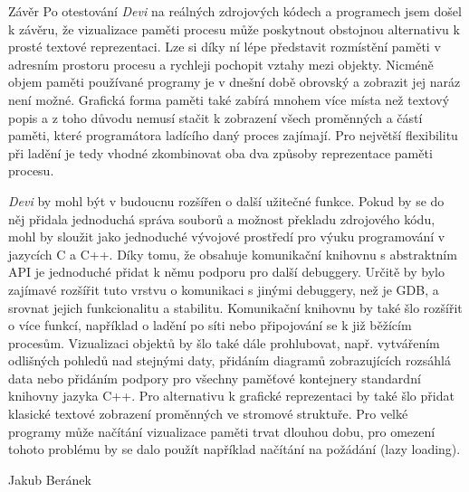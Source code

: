\documentclass[bc,male,python,dept460]{diploma}						%
\newcommand{\parspace}[1][]{
	\ifthenelse{\isempty{#1}}{\vspace{5mm}}{\vspace{#1}}
	\par
}
\begin{document}
\begin{section}{Závěr}
\label{sec:Conclusion}
Po otestování \textit{Devi} na reálných zdrojových kódech a programech jsem došel k závěru, že vizualizace paměti procesu může poskytnout obstojnou
alternativu k prosté textové reprezentaci. Lze si díky ní lépe představit rozmístění paměti v adresním prostoru procesu a rychleji pochopit vztahy mezi objekty.
Nicméně objem paměti používané programy je v dnešní době obrovský a zobrazit jej naráz není možné. Grafická forma paměti také zabírá mnohem více místa než textový
popis a z toho důvodu nemusí stačit k zobrazení všech proměnných a částí paměti, které programátora ladícího daný proces zajímají. Pro největší flexibilitu
při ladění je tedy vhodné zkombinovat oba dva způsoby reprezentace paměti procesu.

\parspace \textit{Devi} by mohl být v budoucnu rozšířen o další užitečné funkce. Pokud by se do něj přidala jednoduchá správa souborů a možnost překladu
zdrojového kódu, mohl by sloužit jako jednoduché vývojové prostředí pro výuku programování v jazycích C a C++.
Díky tomu, že obsahuje komunikační knihovnu s abstraktním API je jednoduché přidat k němu podporu pro další debuggery. Určitě by bylo
zajímavé rozšířit tuto vrstvu o komunikaci s jinými debuggery, než je GDB, a srovnat jejich funkcionalitu a stabilitu.
Komunikační knihovnu by také šlo rozšířit o více funkcí, například o ladění po síti nebo připojování se k již běžícím procesům.
Vizualizaci objektů by šlo také dále prohlubovat, např. vytvářením odlišných pohledů nad stejnými daty, přidáním diagramů zobrazujících rozsáhlá data nebo
přidáním podpory pro všechny paměťové kontejnery standardní knihovny jazyka C++. Pro alternativu k grafické reprezentaci by také šlo přidat klasické textové
zobrazení proměnných ve stromové struktuře. Pro velké programy může načítání vizualizace paměti trvat dlouhou dobu, pro omezení tohoto problému by se dalo
použít například načítání na požádání (lazy loading).
\end{section}

\bigskip
\begin{flushright}
Jakub Beránek
\end{flushright}

\printbibliography %
\end{document}
